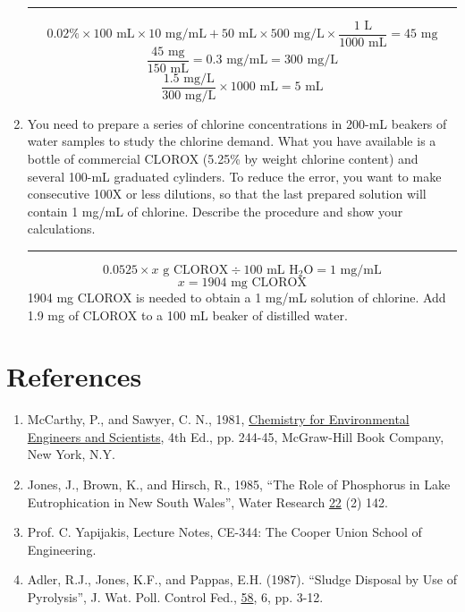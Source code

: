 \documentclass{article}
\begin{document}
\begin{enumerate}
        \\\rule{5cm}{1pt}
        \[0.02\%\times100\text{ mL}\times 10\text{ mg/mL}+50\text{ mL}\times 500\text{ mg/L}\times\frac{1\text{ L}}{1000\text{ mL}}=45\text{ mg}\]
        \[\frac{45\text{ mg}}{150\text{ mL}}=0.3\text{ mg/mL}=300\text{ mg/L}\]
        \[\frac{1.5\text{ mg/L}}{300\text{ mg/L}}\times1000\text{ mL}=\boxed{5\text{ mL}}\]
        \item You need to prepare a series of chlorine concentrations in 200-mL beakers of water samples to study the chlorine demand. What you have available is a bottle of commercial CLOROX (5.25\% by weight chlorine content) and several 100-mL graduated cylinders. To reduce the error, you want to make consecutive 100X or less dilutions, so that the last prepared solution will contain 1 mg/mL of chlorine. Describe the procedure and show your calculations.
        \\\rule{5cm}{1pt}
        \[0.0525\times x\text{ g CLOROX}\div 100\text{ mL H}_2\text{O}=1\text{ mg/mL}\]
        \[x=1904\text{ mg CLOROX}\]
        1904 mg CLOROX is needed to obtain a 1 mg/mL solution of chlorine. Add 1.9 mg of CLOROX to a 100 mL beaker of distilled water.
    \end{enumerate}
    \newpage
    \section{References}
    \begin{enumerate}
        \item McCarthy, P., and Sawyer, C. N., 1981, \underline{Chemistry for Environmental Engineers and Scientists}, 4th Ed., pp. 244-45, McGraw-Hill Book Company, New York, N.Y.
        \item Jones, J., Brown, K., and Hirsch, R., 1985, ``The Role of Phosphorus in Lake Eutrophication in New South Wales'', Water Research \underline{22} (2) 142.
        \item Prof. C. Yapijakis, Lecture Notes, CE-344: The Cooper Union School of Engineering.
        \item Adler, R.J., Jones, K.F., and Pappas, E.H. (1987). ``Sludge Disposal by Use of Pyrolysis'', J. Wat. Poll. Control Fed., \underline{58}, 6, pp. 3-12.
    \end{enumerate}
    
    \newpage
    
    
\end{document}
